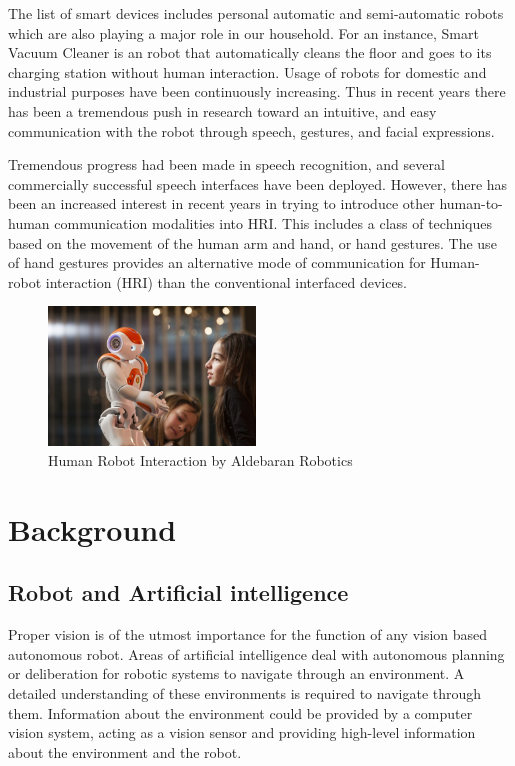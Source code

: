 The list of smart devices includes personal automatic and semi-automatic robots which are also playing a major role in our household. For an instance, Smart Vacuum Cleaner is an robot that automatically cleans the floor and goes to its charging station without human interaction. Usage of robots for domestic and industrial purposes have been continuously increasing. Thus in recent years there has been a tremendous push in research toward an intuitive, and easy communication with the robot through speech, gestures, and facial expressions.

Tremendous progress had been made in speech recognition, and several commercially successful speech interfaces have been deployed. However, there has been an increased interest in recent years in trying to introduce other human-to-human communication modalities into HRI. This includes a class of techniques based on the movement of the human arm and hand, or hand gestures. The use of hand gestures provides an alternative mode of communication for Human-robot interaction (HRI) than the conventional interfaced devices.

\begin{figure}
	[h!] \centering 
	\includegraphics[width=5.5cm]{figures/nao-interaction.png} 
	\caption{Human Robot Interaction by Aldebaran Robotics} 
	\label{fig:nao:interaction} 
\end{figure}


\chapter{Background} 
\section{Robot and Artificial intelligence} Proper vision is of the utmost importance for the function of any vision based autonomous robot. Areas of artificial intelligence deal with autonomous planning or deliberation for robotic systems to navigate through an environment. A detailed understanding of these environments is required to navigate through them. Information about the environment could be provided by a computer vision system, acting as a vision sensor and providing high-level information about the environment and the robot.

